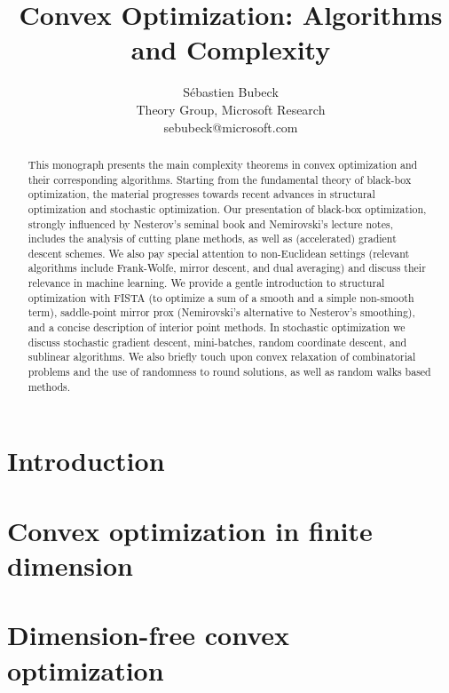 \documentclass[openany]{now}
\title{Convex Optimization: Algorithms and Complexity}
\author{S\'ebastien Bubeck \\
Theory Group, Microsoft Research \\
sebubeck@microsoft.com}
\begin{document}
\frontmatter

\maketitle

\tableofcontents

\mainmatter

\begin{abstract}
This monograph presents the main complexity theorems in convex optimization and their corresponding algorithms.
Starting from the fundamental theory of black-box optimization, the material progresses towards recent advances in structural optimization and stochastic optimization. Our presentation of black-box optimization, strongly influenced by Nesterov's seminal book and Nemirovski's lecture notes, includes the analysis of cutting plane methods, as well as (accelerated) gradient descent schemes. We also pay special attention to non-Euclidean settings (relevant algorithms include Frank-Wolfe, mirror descent, and dual averaging) and discuss their relevance in machine learning. We provide a gentle introduction to structural optimization with FISTA (to optimize a sum of a smooth and a simple non-smooth term), saddle-point mirror prox (Nemirovski's alternative to Nesterov's smoothing), and a concise description of interior point methods. In stochastic optimization we discuss stochastic gradient descent, mini-batches, random coordinate descent, and sublinear algorithms. We also briefly touch upon convex relaxation of combinatorial problems and the use of randomness to round solutions, as well as random walks based methods.
\end{abstract}

\chapter{Introduction}
\label{intro}


\chapter{Convex optimization in finite dimension}
\label{finitedim}


\chapter{Dimension-free convex optimization}
\label{dimfree}

\end{document}

